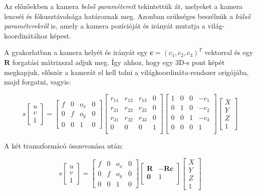 Az előzőekben a kamera \textit{belső paramétereit} tekintettük át, melyeket a kamera lencséi és fókusztávolsága határoznak meg. Azonban szükséges beszélnük a \textit{külső paraméterekről} is, amely a kamera pozícióját és irányát mutatja a világ-koordinátához képest.

A gyakorlatban a kamera helyét és irányát egy $\mathbf{c} = (c_1, c_2, c_3)^T$ vektorral és egy $\mathbf{R}$ forgatási mátrixszal adjuk meg. Így ahhoz, hogy egy 3D-s pont képét megkapjuk, először a kamerát el kell tolni a világkoordináta-rendszer origójába, majd forgatni, vagyis:

\[s \left[\begin{array}{c}
u \\ 
v \\
1
\end{array}\right] = \left[\begin{array}{cccc}
f & 0 & o_x & 0 \\ 
0 & f & o_y & 0 \\
0 & 0 & 1 & 0
\end{array}\right] \left[\begin{array}{cccc}
r_{11} & r_{12} & r_{13} & 0 \\ 
r_{21} & r_{22} & r_{23} & 0 \\ 
r_{31} & r_{32} & r_{33} & 0 \\ 
0 & 0 & 0 & 1 \\ 
\end{array}\right] \left[\begin{array}{cccc}
1 & 0 & 0 & -c_1 \\ 
0 & 1 & 0 & -c_2 \\ 
0 & 0 & 1 & -c_3 \\ 
0 & 0 & 0 & 1 \\ 
\end{array}\right] \left[\begin{array}{c}
X \\ 
Y \\
Z \\
1
\end{array}\right]\]

A két transzformácó összevonása után:

\[s \left[\begin{array}{c}
u \\ 
v \\
1
\end{array}\right] = \left[\begin{array}{cccc}
f & 0 & o_x & 0 \\ 
0 & f & o_y & 0 \\
0 & 0 & 1 & 0
\end{array}\right] \left[\begin{array}{cc}
\mathbf{R} & -\mathbf{R} \mathbf{c} \\ 
\mathbf{0} & 1 \\ 
\end{array}\right] \left[\begin{array}{c}
X \\ 
Y \\
Z \\
1
\end{array}\right]\]

